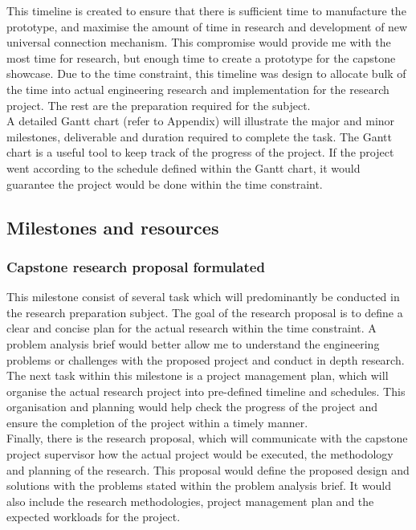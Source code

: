 \documentclass[12pt,A4]{article}
\begin{document}
	
	This timeline is created to ensure that there is sufficient time to manufacture the prototype, and maximise the amount of time in research and development of new universal connection mechanism. This compromise would provide me with the most time for research, but enough time to create a prototype for the capstone showcase. Due to the time constraint, this timeline was design to allocate bulk of the time into actual engineering research and implementation for the research project. The rest are the preparation required for the subject.\\
	
	A detailed Gantt chart (refer to Appendix) will illustrate the major and minor milestones, deliverable and duration required to complete the task. The Gantt chart is a useful tool to keep track of the progress of the project. If the project went according to the schedule defined within the Gantt chart, it would guarantee the project would be done within the time constraint.\\
	
	\subsection{Milestones and resources}
	\subsubsection{Capstone research proposal formulated}
	
	This milestone consist of several task which will predominantly be conducted in the research preparation subject. The goal of the research proposal is to define a clear and concise plan for the actual research within the time constraint. A problem analysis brief would better allow me to understand the engineering problems or challenges with the proposed project and conduct in depth research.\\

	The next task within this milestone is a project management plan, which will organise the actual research project into pre-defined timeline and schedules. This organisation and planning would help check the progress of the project and ensure the completion of the project within a timely manner.\\
	
	Finally, there is the research proposal, which will communicate with the capstone project supervisor how the actual project would be executed, the methodology and planning of the research. This proposal would define the proposed design and solutions with the problems stated within the problem analysis brief. It would also include the research methodologies, project management plan and the expected workloads for the project.\\
	
\end{document}
